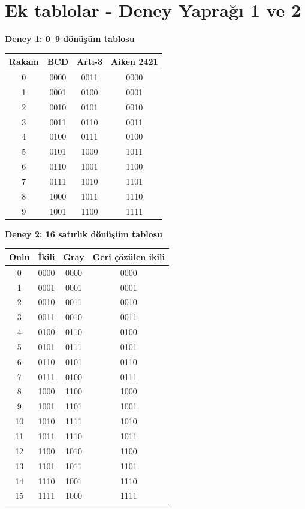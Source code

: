 \documentclass[10pt,a4paper]{article}
\begin{document}
\section*{Ek tablolar - Deney Yaprağı 1 ve 2}
\textbf{Deney 1: 0--9 dönüşüm tablosu}
\begin{center}
\begin{tabular}{cccc}
\toprule Rakam & BCD & Artı-3 & Aiken 2421 \\ \midrule
0 & 0000 & 0011 & 0000 \\
1 & 0001 & 0100 & 0001 \\
2 & 0010 & 0101 & 0010 \\
3 & 0011 & 0110 & 0011 \\
4 & 0100 & 0111 & 0100 \\
5 & 0101 & 1000 & 1011 \\
6 & 0110 & 1001 & 1100 \\
7 & 0111 & 1010 & 1101 \\
8 & 1000 & 1011 & 1110 \\
9 & 1001 & 1100 & 1111 \\
\bottomrule
\end{tabular}
\end{center}
\textbf{Deney 2: 16 satırlık dönüşüm tablosu}
\begin{center}
\begin{tabular}{cccc}
\toprule Onlu & İkili & Gray & Geri çözülen ikili \\ \midrule
0 & 0000 & 0000 & 0000 \\
1 & 0001 & 0001 & 0001 \\
2 & 0010 & 0011 & 0010 \\
3 & 0011 & 0010 & 0011 \\
4 & 0100 & 0110 & 0100 \\
5 & 0101 & 0111 & 0101 \\
6 & 0110 & 0101 & 0110 \\
7 & 0111 & 0100 & 0111 \\
8 & 1000 & 1100 & 1000 \\
9 & 1001 & 1101 & 1001 \\
10 & 1010 & 1111 & 1010 \\
11 & 1011 & 1110 & 1011 \\
12 & 1100 & 1010 & 1100 \\
13 & 1101 & 1011 & 1101 \\
14 & 1110 & 1001 & 1110 \\
15 & 1111 & 1000 & 1111 \\
\bottomrule
\end{tabular}
\end{center}
\end{document}
